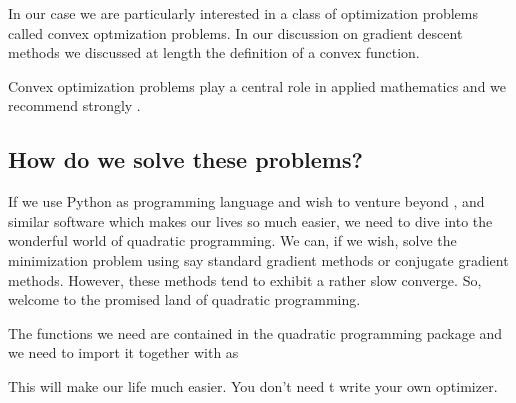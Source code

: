 \documentclass[letterpaper,10pt,english]{sphinxmanual}
\begin{document}
In our case we are particularly interested in a class of optimization problems called convex optmization problems.
In our discussion on gradient descent methods we discussed at length the definition of a convex function.

Convex optimization problems play a central role in applied mathematics and we recommend strongly .


\subsection{How do we solve these problems?}
\label{\detokenize{chapter7:how-do-we-solve-these-problems}}
If we use Python as programming language and wish to venture beyond
,  and similar software which makes our
lives so much easier, we need to dive into the wonderful world of
quadratic programming. We can, if we wish, solve the minimization
problem using say standard gradient methods or conjugate gradient
methods. However, these methods tend to exhibit a rather slow
converge. So, welcome to the promised land of quadratic programming.

The functions we need are contained in the quadratic programming package  and we need to import it together with  as

\begin{sphinxVerbatim}[commandchars=\\\{\}]
 
 
\end{sphinxVerbatim}

This will make our life much easier. You don’t need t write your own optimizer.
\end{document}
